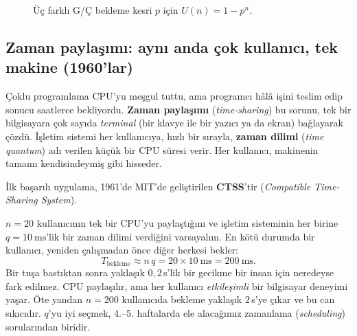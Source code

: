 \documentclass[11pt,a4paper]{article}
\newcommand{\term}[1]{\textbf{\color{mintdeep}#1}}
\begin{document}
\begin{figure}[H]
\centering
{}
\caption{Üç farklı G/Ç bekleme kesri $p$ için $U(n)=1-p^{n}$.}
\end{figure}

\subsection{Zaman paylaşımı: aynı anda çok kullanıcı, tek makine (1960'lar)}

Çoklu programlama CPU'yu meşgul tuttu, ama programcı hâlâ işini teslim edip sonucu saatlerce bekliyordu. \term{Zaman paylaşımı} (\emph{time-sharing}) bu sorunu, tek bir bilgisayara çok sayıda \emph{terminal} (bir klavye ile bir yazıcı ya da ekran) bağlayarak çözdü. İşletim sistemi her kullanıcıya, hızlı bir sırayla, \term{zaman dilimi} (\emph{time quantum}) adı verilen küçük bir CPU süresi verir. Her kullanıcı, makinenin tamamı kendisindeymiş gibi hisseder.

İlk başarılı uygulama, 1961'de MIT'de geliştirilen \textbf{CTSS}'tir (\emph{Compatible Time-Sharing System}).

\begin{example}
$n = 20$ kullanıcının tek bir CPU'yu paylaştığını ve işletim sisteminin her birine $q = 10\ \text{ms}$'lik bir zaman dilimi verdiğini varsayalım. En kötü durumda bir kullanıcı, yeniden çalışmadan önce diğer herkesi bekler:
\[
T_{\text{bekleme}} \approx n\,q = 20 \times 10\ \text{ms} = 200\ \text{ms}.
\]
Bir tuşa bastıktan sonra yaklaşık $0{,}2$\,s'lik bir gecikme bir insan için neredeyse fark edilmez. CPU paylaşılır, ama her kullanıcı \emph{etkileşimli} bir bilgisayar deneyimi yaşar. Öte yandan $n=200$ kullanıcıda bekleme yaklaşık $2$\,s'ye çıkar ve bu can sıkıcıdır. $q$'yu iyi seçmek, 4.--5. haftalarda ele alacağımız zamanlama (\emph{scheduling}) sorularından biridir.
\end{example}
\end{document}
